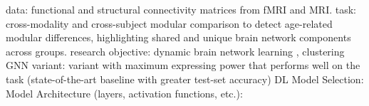 data: functional and structural connectivity matrices from fMRI and MRI. 
task: cross-modality and cross-subject modular comparison 
to detect age-related modular differences, highlighting shared 
and unique brain network components across groups. 
research objective: dynamic brain network learning \cite{Tang2023}, 
clustering
GNN variant: variant with maximum expressing power that performs
well on the task (state-of-the-art baseline with greater test-set
accuracy)
DL Model Selection:
Model Architecture (layers, activation functions, etc.):




